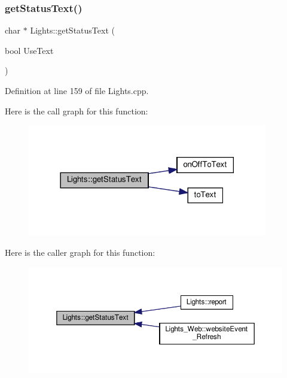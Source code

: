 \subsubsection{\texorpdfstring{get\+Status\+Text()}{getStatusText()}\hspace{0.1cm}{\footnotesize\ttfamily [1/2]}}
{\footnotesize\ttfamily char $\ast$ Lights\+::get\+Status\+Text (\begin{DoxyParamCaption}\item[{bool}]{Use\+Text }\end{DoxyParamCaption})}



Definition at line 159 of file Lights.\+cpp.

Here is the call graph for this function\+:
\nopagebreak
\begin{figure}[H]
\begin{center}
\leavevmode
\includegraphics[width=297pt]{class_lights_a713a28eba8f6fd8fb259bac4175ece26_cgraph}
\end{center}
\end{figure}
Here is the caller graph for this function\+:
\nopagebreak
\begin{figure}[H]
\begin{center}
\leavevmode
\includegraphics[width=350pt]{class_lights_a713a28eba8f6fd8fb259bac4175ece26_icgraph}
\end{center}
\end{figure}
\mbox{\label{class_lights_a1091d64a103a8356b03f8b080d256054}} 
